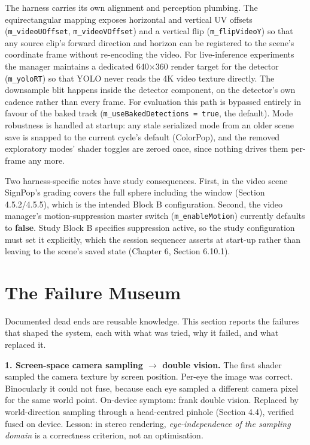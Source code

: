The harness carries its own alignment and perception plumbing. The equirectangular mapping exposes
horizontal and vertical UV offsets (\verb|m_videoUOffset|, \verb|m_videoVOffset|) and a vertical flip
(\verb|m_flipVideoY|) so that any source clip's forward direction and horizon can be registered to the
scene's coordinate frame without re-encoding the video. For live-inference experiments the manager
maintains a dedicated 640$\times$360 render target for the detector (\verb|m_yoloRT|) so that YOLO never reads
the 4K video texture directly. The downsample blit happens inside the detector component, on the
detector's own cadence rather than every frame. For evaluation this path is bypassed entirely in
favour of the baked track (\verb|m_useBakedDetections = true|, the default). Mode robustness is handled at
startup: any stale serialized mode from an older scene save is snapped to the current cycle's default
(ColorPop), and the removed exploratory modes' shader toggles are zeroed once, since nothing drives
them per-frame any more.

Two harness-specific notes have study consequences. First, in the video scene SignPop's grading
covers the full sphere including the window (Section 4.5.2/4.5.5), which is the intended Block B
configuration. Second, the video manager's motion-suppression master switch (\verb|m_enableMotion|)
currently defaults to \textbf{false}. Study Block B specifies suppression active, so the study
configuration must set it explicitly, which the session sequencer asserts at start-up rather than
leaving to the scene's saved state (Chapter 6, Section 6.10.1).

\section{The Failure Museum}

Documented dead ends are reusable knowledge. This section reports the failures that shaped the system,
each with what was tried, why it failed, and what replaced it.

\textbf{1. Screen-space camera sampling $\rightarrow$ double vision.} The first shader sampled the camera texture by
screen position. Per-eye the image was correct. Binocularly it could not fuse, because each eye
sampled a different camera pixel for the same world point. On-device symptom: frank double vision.
Replaced by world-direction sampling through a head-centred pinhole (Section 4.4), verified fused on
device. Lesson: in stereo rendering, \textit{eye-independence of the sampling domain} is a correctness
criterion, not an optimisation.

